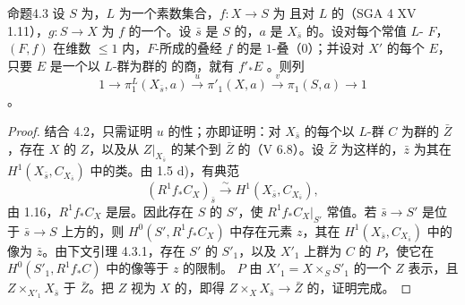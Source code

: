 \begin{SGAresult}{命题}{4.3}
设 $S$ 为，$L$ 为一个素数集合，$f:X\to S$ 为 且对 $L$ 的（SGA 4 XV 1.11），$g:S\to X$ 为 $f$ 的一个。设 $\bar s$ 是 $S$ 的，$a$ 是 $X_{\bar s}$ 的。设对每个常值 $L$- $F$，$(F,f)$ 在维数 $\leq1$ 内，$F$-所成的叠经 $f$ 的是 $1$-叠（0）；并设对 $X'$ 的每个 $E$，只要 $E$ 是一个以 $L$-群为群的 的商，就有 $f'_*E$ 。则列
\[
1\longrightarrow\pi_1^L(X_{\bar s},a)\xrightarrow{u}\pi'_1(X,a)\xrightarrow{v}\pi_1(S,a)\longrightarrow1\tag{4.3.1}
\]
。
\end{SGAresult}
\begin{proof}
结合 4.2，只需证明 $u$ 的性；亦即证明：对 $X_{\bar s}$ 的每个以 $L$-群 $C$ 为群的 $\bar Z$，存在 $X$ 的 $Z$，以及从 $Z|_{X_{\bar s}}$ 的某个到 $\bar Z$ 的（V 6.8）。设 $\bar Z$ 为这样的，$\bar z$ 为其在 $H^1(X_{\bar s},C_{X_{\bar s}})$ 中的类。由 1.5 d)，有典范
\[(R^1f_*C_X)_{\bar s}\xrightarrow{\sim}H^1(X_{\bar s},C_{X_{\bar s}}),\]
由 1.16，$R^1f_*C_X$ 是层。因此存在 $S$ 的 $S'$，使 $R^1f_*C_X|_{S'}$ 常值。若 $\bar s\to S'$ 是位于 $\bar s\to S$ 上方的，则 $H^0(S',R^1f_*C_X)$ 中存在元素 $z$，其在 $H^1(X_{\bar s},C_{X_{\bar s}})$ 中的像为 $\bar z$。由下文引理 4.3.1，存在 $S'$ 的 $S'_1$，以及 $X'_1$ 上群为 $C$ 的 $P$，使它在 $H^0(S'_1,R^1f_*C)$ 中的像等于 $z$ 的限制。 $P$ 由 $X'_1=X\times_S S'_1$ 的一个 $Z$ 表示，且 $Z\times_{X'_1}X_{\bar s}$ 于 $\bar Z$。把 $Z$ 视为 $X$ 的，即得 $Z\times_X X_{\bar s}\to\bar Z$ 的，证明完成。
\end{proof}

